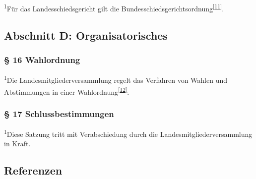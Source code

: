 \textsuperscript{1}Für das Landesschiedsgericht gilt die
Bundesschiedsgerichtsordnung\textsuperscript{\href{\#cite\_note-10}{{[}11{]}}}.

\subsection{Abschnitt D: Organisatorisches}

\subsubsection{§ 16 Wahlordnung}

\textsuperscript{1}Die Landesmitgliederversammlung regelt das Verfahren
von Wahlen und Abstimmungen in einer
Wahlordnung\textsuperscript{\href{\#cite\_note-11}{{[}12{]}}}.

\subsubsection{§ 17 Schlussbestimmungen}

\textsuperscript{1}Diese Satzung tritt mit Verabschiedung durch die
Landesmitgliederversammlung in Kraft.

\subsection{Referenzen}

